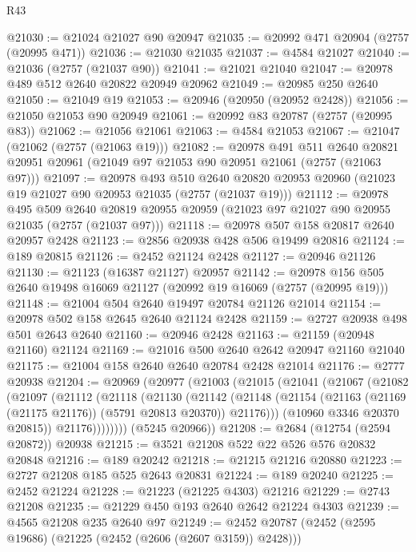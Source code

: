 \begin{lexlean}{R43}
\begin{coremodule}
@21030 := @21024 @21027 @90 @20947
@21035 := @20992 @471 @20904 (@2757 (@20995 @471))
@21036 := @21030 @21035
@21037 := @4584 @21027
@21040 := @21036 (@2757 (@21037 @90))
@21041 := @21021 @21040
@21047 := @20978 @489 @512 @2640 @20822 @20949 @20962
@21049 := @20985 @250 @2640
@21050 := @21049 @19
@21053 := @20946 (@20950 (@20952 @2428))
@21056 := @21050 @21053 @90 @20949
@21061 := @20992 @83 @20787 (@2757 (@20995 @83))
@21062 := @21056 @21061
@21063 := @4584 @21053
@21067 := @21047 (@21062 (@2757 (@21063 @19)))
@21082 := @20978
    @491
    @511
    @2640
    @20821
    @20951
    @20961
    (@21049 @97 @21053 @90 @20951 @21061 (@2757 (@21063 @97)))
@21097 := @20978
    @493
    @510
    @2640
    @20820
    @20953
    @20960
    (@21023 @19 @21027 @90 @20953 @21035 (@2757 (@21037 @19)))
@21112 := @20978
    @495
    @509
    @2640
    @20819
    @20955
    @20959
    (@21023 @97 @21027 @90 @20955 @21035 (@2757 (@21037 @97)))
@21118 := @20978 @507 @158 @20817 @2640 @20957 @2428
@21123 := @2856 @20938 @428 @506 @19499 @20816
@21124 := @189 @20815
@21126 := @2452 @21124 @2428
@21127 := @20946 @21126
@21130 := @21123 (@16387 @21127) @20957
@21142 := @20978 @156 @505 @2640 @19498 @16069 @21127 (@20992 @19 @16069 (@2757 (@20995 @19)))
@21148 := @21004 @504 @2640 @19497 @20784 @21126 @21014
@21154 := @20978 @502 @158 @2645 @2640 @21124 @2428
@21159 := @2727 @20938 @498 @501 @2643 @2640
@21160 := @20946 @2428
@21163 := @21159 (@20948 @21160) @21124
@21169 := @21016 @500 @2640 @2642 @20947 @21160 @21040
@21175 := @21004 @158 @2640 @2640 @20784 @2428 @21014
@21176 := @2777 @20938
@21204 := @20969
    (@20977
      (@21003
        (@21015
          (@21041
            (@21067
              (@21082
                (@21097
                  (@21112
                    (@21118
                      (@21130
                        (@21142
                          (@21148
                            (@21154
                              (@21163 (@21169 (@21175 @21176)) (@5791 @20813 @20370))
                              @21176)))
                        (@10960 @3346 @20370 @20815))
                      @21176))))))))
      (@5245 @20966))
@21208 := @2684 (@12754 (@2594 @20872)) @20938
@21215 := @3521 @21208 @522 @22 @526 @576 @20832 @20848
@21216 := @189 @20242
@21218 := @21215 @21216 @20880
@21223 := @2727 @21208 @185 @525 @2643 @20831
@21224 := @189 @20240
@21225 := @2452 @21224
@21228 := @21223 (@21225 @4303) @21216
@21229 := @2743 @21208
@21235 := @21229 @450 @193 @2640 @2642 @21224 @4303
@21239 := @4565 @21208 @235 @2640 @97
@21249 := @2452 @20787 (@2452 (@2595 @19686) (@21225 (@2452 (@2606 (@2607 @3159)) @2428)))

\end{coremodule}
\end{lexlean}
